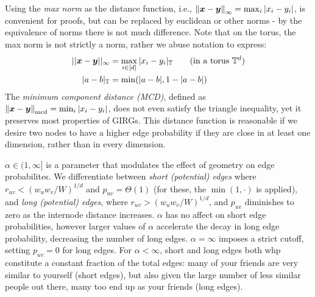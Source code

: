 
Using the \textit{max norm} as the distance function, i.e., $\left\lVert \bm{x} - \bm{y}\right\rVert_\infty = \max_i |x_i - y_i|$, is convenient for proofs, but can be replaced by euclidean or other norms - by the equivalence of norms there is not much difference. Note that on the torus, the max norm is not strictly a norm, rather we abuse notation to express:
\begin{align}
    ||\bm{x} - \bm{y}||_\infty &= \max_{i \in [d]} |x_i - y_i|_{\mathbb{T}}
    \quad\quad \text{(in a torus $\mathbb{T}^d$)}
    \\
    |a - b|_{\mathbb{T}} &= \min(|a - b|, 1 - |a - b|)
\end{align}
The \textit{minimum component distance (MCD)}, defined as $\left\lVert \bm{x} - \bm{y}\right\rVert_{\mathrm{mcd}} = \min_i |x_i - y_i|$, does not even satisfy the triangle inequality, yet it preserves most properties of GIRGs. This distance function is reasonable if we desire two nodes to have a higher edge probability if they are close in at least one dimension, rather than in every dimension.

$\alpha \in (1, \infty]$ is a parameter that modulates the effect of geometry on edge probabilites. We differentiate between \textit{short (potential) edges} where $r_{uv} < (w_u w_v / W)^{1/d}$ and $p_{uv} = \Theta(1)$ (for these, the $\min(1, \cdot)$ is applied), and \textit{long (potential) edges}, where $r_{uv} > (w_u w_v / W)^{1/d}$, and $p_{uv}$ diminishes to zero as the internode distance increases. $\alpha$ has no affect on short edge probabilities, however larger values of $\alpha$ accelerate the decay in long edge probability, decreasing the number of long edges. 
$\alpha=\infty$ imposes a strict cutoff, setting $p_{uv} = 0$ for long edges. For $\alpha < \infty$, short and long edges both whp constitute a constant fraction of the total edges: many of your friends are very similar to yourself (short edges), but also given the large number of less similar people out there, many too end up as your friends (long edges). 

